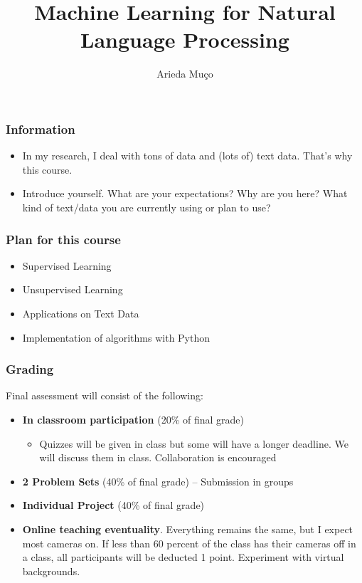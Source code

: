 \documentclass[compress, aspectratio=54]{beamer}
\title[Introduction]{Machine Learning for Natural Language Processing}
\author[Arieda Mu\c co]{Arieda Mu\c co}
\institute[CEU]{Central European University}
\date{}
\begin{document}
\captionsetup[subfigure]{labelformat=empty}

\frame{\titlepage}



\begin{frame}
\frametitle{Information}
\begin{itemize}
\item In my research, I deal with tons of data and (lots of) text data. That's why this course.
\item Introduce yourself. What are your expectations? Why are you here? What kind of text/data you are currently using or plan to use? 
\end{itemize}
\end{frame}

\begin{frame}
\frametitle{Plan for this course}
\begin{itemize}
\item Supervised Learning
\item Unsupervised Learning
\item Applications on Text Data

\item Implementation of algorithms with Python
\end{itemize}
\end{frame}






\begin{frame}
\frametitle{Grading}
Final assessment will consist of the following:
\begin{itemize}
\item \textbf{In classroom participation} (20\% of final grade)
\begin{itemize}
\item Quizzes will be given in class but some will have a longer deadline. We will discuss them in class.  Collaboration is encouraged
\end{itemize}

\item \textbf{2 Problem Sets} (40\% of final grade) -- Submission in groups
\item \textbf{Individual Project}  (40\% of final grade)

\item \textbf{Online teaching eventuality}. Everything remains the same, but I expect most cameras on. If less than 60 percent of the class has their cameras off in a class, all participants will be deducted 1 point. Experiment with virtual backgrounds.

\end{itemize}
\end{frame}
\end{document}
